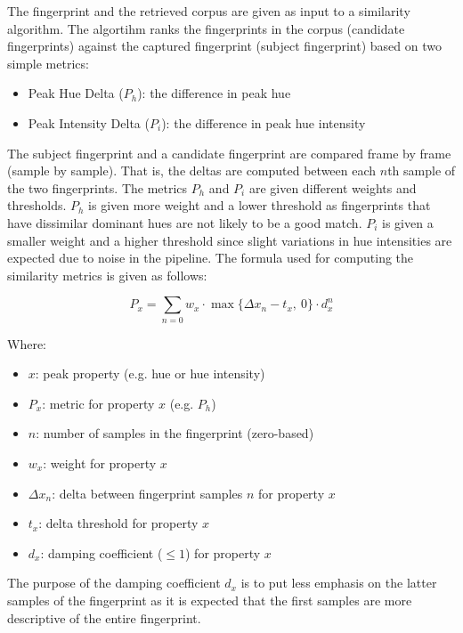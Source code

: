 \documentclass[thesis.tex]{subfiles}
\begin{document}
The fingerprint and the retrieved corpus are given as input to a similarity algorithm. The algortihm ranks the fingerprints in the corpus (candidate fingerprints) against the captured fingerprint (subject fingerprint) based on two simple metrics:

\begin{itemize}
	\item Peak Hue Delta ($P_h$): the difference in peak hue
	\item Peak Intensity Delta ($P_i$): the difference in peak hue intensity
\end{itemize}

The subject fingerprint and a candidate fingerprint are compared frame by frame (sample by sample). That is, the deltas are computed between each $n$th sample of the two fingerprints. The metrics $P_h$ and $P_i$ are given different weights and thresholds. $P_h$ is given more weight and a lower threshold as fingerprints that have dissimilar dominant hues are not likely to be a good match. $P_i$ is given a smaller weight and a higher threshold since slight variations in hue intensities are expected due to noise in the pipeline. The formula used for computing the similarity metrics is given as follows:

\begin{equation}
\label{equation:similarity-metric}
	P_x = \sum \limits_{n=0} { w_x \cdot \max \{\Delta{x_n}-t_x,\ 0\} \cdot d_x^n }
\end{equation}

Where:
\begin{itemize}[label=]
	\item $x$: peak property (e.g. hue or hue intensity)
    \item $P_x$: metric for property $x$ (e.g. $P_h$)
    \item $n$: number of samples in the fingerprint (zero-based)
    \item $w_x$: weight for property $x$
    \item $\Delta{x_n}$: delta between fingerprint samples $n$ for property $x$
    \item $t_x$: delta threshold for property $x$
    \item $d_x$: damping coefficient ($\leq 1$) for property $x$
\end{itemize}

\noindent The purpose of the damping coefficient $d_x$ is to put less emphasis on the latter samples of the fingerprint as it is expected that the first samples are more descriptive of the entire fingerprint.
\end{document}
